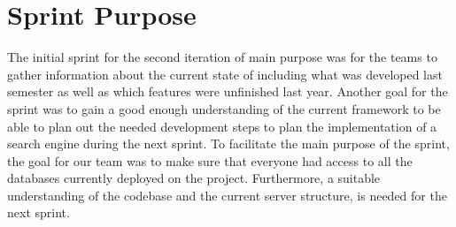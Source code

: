 \section{Sprint Purpose}
The initial sprint for the second iteration of \knox{} main purpose was for the teams to gather information about the current state of \knox{} including what was developed last semester as well as which features were unfinished last year. 
Another goal for the sprint was to gain a good enough understanding of the current framework to be able to plan out the needed development steps to plan the implementation of a search engine during the next sprint. 
To facilitate the main purpose of the sprint, the goal for our team was to make sure that everyone had access to all the databases currently deployed on the \knox{} project. 
Furthermore, a suitable understanding of the codebase and the current server structure, is needed for the next sprint.